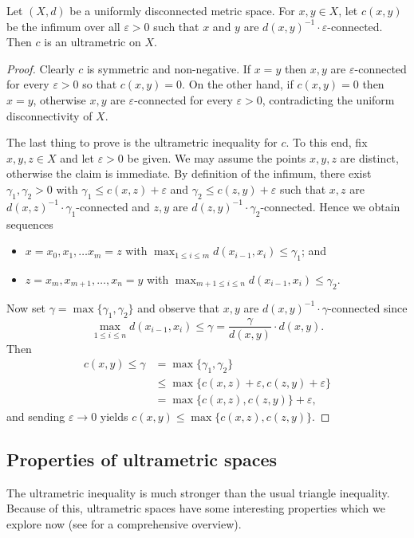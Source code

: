 Let \( (X,d) \) be a uniformly disconnected metric space. For \( x,y \in X \), let \( c(x,y) \) be the infimum over all \( \varepsilon > 0 \) such that \( x \) and \( y \) are \( d(x,y)^{-1} \cdot \varepsilon  \)-connected. Then \( c \) is an ultrametric on \( X \).
\begin{proof}
Clearly \( c \) is symmetric and non-negative. If \( x = y \) then \( x,y \) are \( \varepsilon  \)-connected for every \( \varepsilon > 0 \) so that \( c(x,y) = 0 \). On the other hand, if \( c(x,y) = 0  \) then \( x = y \), otherwise \( x,y \) are \( \varepsilon  \)-connected for every \( \varepsilon > 0 \), contradicting the uniform disconnectivity of \( X \).

The last thing to prove is the ultrametric inequality for \( c \). To this end, fix \( x,y,z \in X \) and let \( \varepsilon > 0 \) be given. We may assume the points \( x,y,z \) are distinct, otherwise the claim is immediate. By definition of the infimum, there exist \( \gamma_1, \gamma_2 > 0 \) with \(\gamma_1 \leq c(x,z) + \varepsilon \) and \(\gamma_2 \leq c(z,y) + \varepsilon  \) such that \( x,z \) are \( d(x,z)^{-1} \cdot \gamma_1 \)-connected and \( z,y \) are \(d(z,y)^{-1} \cdot \gamma_2 \)-connected. Hence we obtain sequences
\begin{itemize}[leftmargin=0.8cm]
	\item \( x = x_0, x_1, \hdots x_{m} = z  \) with \( \max_{1 \leq i \leq m} d(x_{i-1} , x_{i}) \leq \gamma_1 \); and
	\item \( z = x_{m} , x_{m+1} , \hdots , x_{n} = y \) with \( \max_{m+1 \leq i \leq n} d(x_{i-1} , x_{i}) \leq \gamma_2 \). 
\end{itemize}
Now set \( \gamma = \max \{ \gamma_1, \gamma_2 \}  \) and observe that \( x,y \) are \(d(x,y)^{-1}\cdot \gamma \)-connected since \[ \max _{1 \leq i \leq n} d(x_{i-1} , x_{i} ) \leq \gamma = \frac{\gamma}{d(x,y)} \cdot d(x,y). \] 
Then
\begin{align*}
	c(x,y) \leq \gamma &= \max \{ \gamma_1, \gamma_2 \} \\
	       &\leq \max \{ c(x,z) + \varepsilon , c(z,y) + \varepsilon  \} \\
	       &= \max \{ c(x,z), c(z,y) \} + \varepsilon,
\end{align*}
and sending \( \varepsilon \to 0 \) yields \( c(x,y) \leq \max \{ c(x,z), c(z,y) \} \).
\end{proof}
\subsection{Properties of ultrametric spaces} The ultrametric inequality is much stronger than the usual triangle inequality. Because of this, ultrametric spaces have some interesting properties which we explore now (see \cite{ultrametric:1985} for a comprehensive overview).

